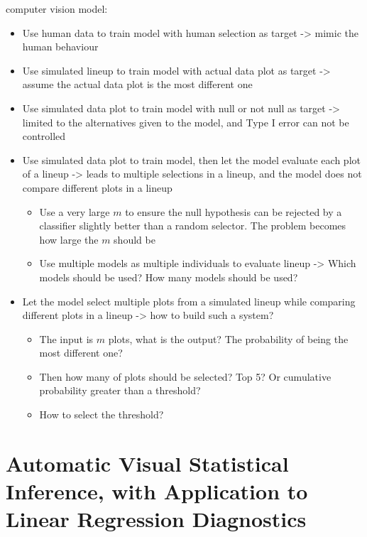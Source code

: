 \documentclass{monashthesis}
\begin{document}
computer vision model:

\begin{itemize}
\tightlist
\item
  Use human data to train model with human selection as target -\textgreater{} mimic the human behaviour
\item
  Use simulated lineup to train model with actual data plot as target -\textgreater{} assume the actual data plot is the most different one
\item
  Use simulated data plot to train model with null or not null as target -\textgreater{} limited to the alternatives given to the model, and Type I error can not be controlled
\item
  Use simulated data plot to train model, then let the model evaluate each plot of a lineup -\textgreater{} leads to multiple selections in a lineup, and the model does not compare different plots in a lineup

  \begin{itemize}
  \tightlist
  \item
    Use a very large \(m\) to ensure the null hypothesis can be rejected by a classifier slightly better than a random selector. The problem becomes how large the \(m\) should be
  \item
    Use multiple models as multiple individuals to evaluate lineup -\textgreater{} Which models should be used? How many models should be used?
  \end{itemize}
\item
  Let the model select multiple plots from a simulated lineup while comparing different plots in a lineup -\textgreater{} how to build such a system?

  \begin{itemize}
  \tightlist
  \item
    The input is \(m\) plots, what is the output? The probability of being the most different one?
  \item
    Then how many of plots should be selected? Top 5? Or cumulative probability greater than a threshold?
  \item
    How to select the threshold?
  \end{itemize}
\end{itemize}

\hypertarget{ch:paper1}{%
\chapter{Automatic Visual Statistical Inference, with Application to Linear Regression Diagnostics}\label{ch:paper1}}
\end{document}
